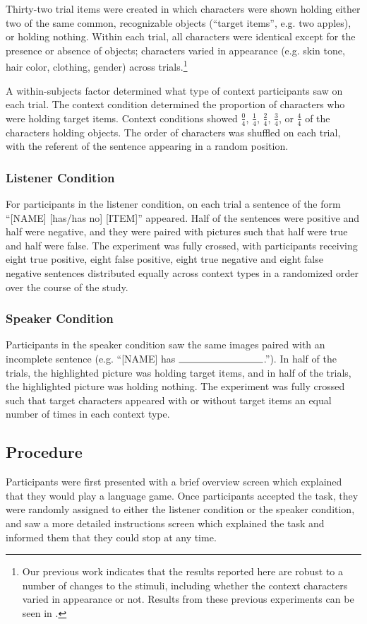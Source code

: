 \documentclass[man, noapacite]{apa2}
\begin{document}
Thirty-two trial items were created in which characters were shown holding either two of the same common, recognizable objects (``target items'', e.g. two apples), or holding nothing.  Within each trial, all characters were identical except for the presence or absence of objects; characters varied in appearance (e.g. skin tone, hair color, clothing, gender) across trials.\footnote{Our previous work indicates that the results reported here are robust to a number of changes to the stimuli, including whether the context characters varied in appearance or not.  Results from these previous experiments can be seen in .}

A within-subjects factor determined what type of context participants saw on each trial.  The context condition determined the proportion of characters who were holding target items.  Context conditions showed $\frac{0}{4}$, $\frac{1}{4}$, $\frac{2}{4}$, $\frac{3}{4}$, or $\frac{4}{4}$ of the characters holding objects. The order of characters was shuffled on each trial, with the referent of the sentence appearing in a random position.  

\subsubsection{Listener Condition}
For participants in the listener condition, on each trial a sentence of the form ``[NAME] [has/has no] [ITEM]'' appeared.  Half of the sentences were positive and half were negative, and they were paired with pictures such that half were true and half were false.  The experiment was fully crossed, with participants receiving eight true positive, eight false positive, eight true negative and eight false negative sentences distributed equally across context types in a randomized order over the course of the study.  

\subsubsection{Speaker Condition}
Participants in the speaker condition saw the same images paired with an incomplete sentence (e.g. ``[NAME] has $\rule{3cm}{0.15mm}$.''). In half of the trials, the highlighted picture was holding target items, and in half of the trials, the highlighted picture was holding nothing.  The experiment was fully crossed such that target characters appeared with or without target items an equal number of times in each context type.  

\subsection{Procedure}
Participants were first presented with a brief overview screen which explained that they would play a language game.  Once participants accepted the task, they were randomly assigned to either the listener condition or the speaker condition, and saw a more detailed instructions screen which explained the task and informed them that they could stop at any time.  
\end{document}

